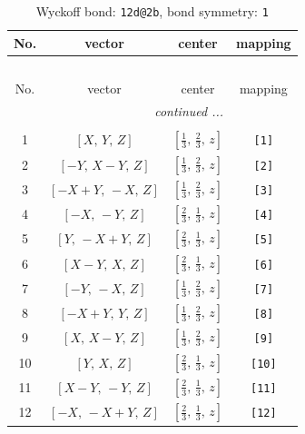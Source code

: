 \documentclass[fleqn,8pt]{jsarticle}
\begin{document}
\begin{longtable}{cccc}
\caption{Wyckoff bond: {\tt 12d@2b}, bond symmetry: {\tt 1}}
 \\
 \hline \hline
No. & vector & center & mapping \\ \hline \endfirsthead

\multicolumn{3}{l}{\tablename\ \thetable{}} \\
 \hline \hline
No. & vector & center & mapping \\ \hline \endhead

 \hline \hline
\multicolumn{3}{r}{\footnotesize\it continued ...} \\ \endfoot

 \hline \hline
\multicolumn{3}{r}{} \\ \endlastfoot

1 & $\left[ X,\, Y,\, Z \right]$ & $\left[ \frac{1}{3},\, \frac{2}{3},\, z \right]$ & {\tt [1]} \\ \hline
2 & $\left[ - Y,\, X - Y,\, Z \right]$ & $\left[ \frac{1}{3},\, \frac{2}{3},\, z \right]$ & {\tt [2]} \\ \hline
3 & $\left[ - X + Y,\, - X,\, Z \right]$ & $\left[ \frac{1}{3},\, \frac{2}{3},\, z \right]$ & {\tt [3]} \\ \hline
4 & $\left[ - X,\, - Y,\, Z \right]$ & $\left[ \frac{2}{3},\, \frac{1}{3},\, z \right]$ & {\tt [4]} \\ \hline
5 & $\left[ Y,\, - X + Y,\, Z \right]$ & $\left[ \frac{2}{3},\, \frac{1}{3},\, z \right]$ & {\tt [5]} \\ \hline
6 & $\left[ X - Y,\, X,\, Z \right]$ & $\left[ \frac{2}{3},\, \frac{1}{3},\, z \right]$ & {\tt [6]} \\ \hline
7 & $\left[ - Y,\, - X,\, Z \right]$ & $\left[ \frac{1}{3},\, \frac{2}{3},\, z \right]$ & {\tt [7]} \\ \hline
8 & $\left[ - X + Y,\, Y,\, Z \right]$ & $\left[ \frac{1}{3},\, \frac{2}{3},\, z \right]$ & {\tt [8]} \\ \hline
9 & $\left[ X,\, X - Y,\, Z \right]$ & $\left[ \frac{1}{3},\, \frac{2}{3},\, z \right]$ & {\tt [9]} \\ \hline
10 & $\left[ Y,\, X,\, Z \right]$ & $\left[ \frac{2}{3},\, \frac{1}{3},\, z \right]$ & {\tt [10]} \\ \hline
11 & $\left[ X - Y,\, - Y,\, Z \right]$ & $\left[ \frac{2}{3},\, \frac{1}{3},\, z \right]$ & {\tt [11]} \\ \hline
12 & $\left[ - X,\, - X + Y,\, Z \right]$ & $\left[ \frac{2}{3},\, \frac{1}{3},\, z \right]$ & {\tt [12]} \\
\end{longtable}
\end{document}
